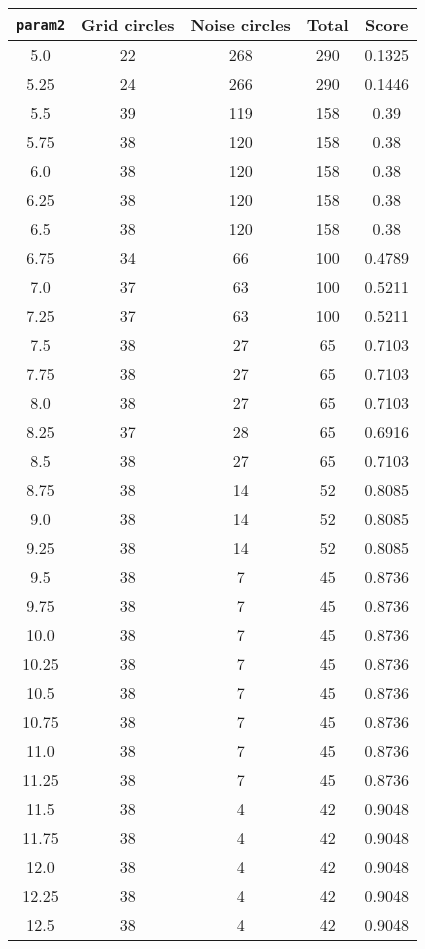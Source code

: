 \documentclass[letterpaper, 12pt]{article}
\begin{document}
\begin{longtable}{|c|c|c|c|c|}
\hline
\textbf{\texttt{param2}} & \textbf{Grid circles} & \textbf{Noise circles} & \textbf{Total} & \textbf{Score} \\
\hline
5.0 & 22 & 268 & 290 & 0.1325 \\
\hline
5.25 & 24 & 266 & 290 & 0.1446 \\
\hline
5.5 & 39 & 119 & 158 & 0.39 \\
\hline
5.75 & 38 & 120 & 158 & 0.38 \\
\hline
6.0 & 38 & 120 & 158 & 0.38 \\
\hline
6.25 & 38 & 120 & 158 & 0.38 \\
\hline
6.5 & 38 & 120 & 158 & 0.38 \\
\hline
6.75 & 34 & 66 & 100 & 0.4789 \\
\hline
7.0 & 37 & 63 & 100 & 0.5211 \\
\hline
7.25 & 37 & 63 & 100 & 0.5211 \\
\hline
7.5 & 38 & 27 & 65 & 0.7103 \\
\hline
7.75 & 38 & 27 & 65 & 0.7103 \\
\hline
8.0 & 38 & 27 & 65 & 0.7103 \\
\hline
8.25 & 37 & 28 & 65 & 0.6916 \\
\hline
8.5 & 38 & 27 & 65 & 0.7103 \\
\hline
8.75 & 38 & 14 & 52 & 0.8085 \\
\hline
9.0 & 38 & 14 & 52 & 0.8085 \\
\hline
9.25 & 38 & 14 & 52 & 0.8085 \\
\hline
9.5 & 38 & 7 & 45 & 0.8736 \\
\hline
9.75 & 38 & 7 & 45 & 0.8736 \\
\hline
10.0 & 38 & 7 & 45 & 0.8736 \\
\hline
10.25 & 38 & 7 & 45 & 0.8736 \\
\hline
10.5 & 38 & 7 & 45 & 0.8736 \\
\hline
10.75 & 38 & 7 & 45 & 0.8736 \\
\hline
11.0 & 38 & 7 & 45 & 0.8736 \\
\hline
11.25 & 38 & 7 & 45 & 0.8736 \\
\hline
11.5 & 38 & 4 & 42 & 0.9048 \\
\hline
11.75 & 38 & 4 & 42 & 0.9048 \\
\hline
12.0 & 38 & 4 & 42 & 0.9048 \\
\hline
12.25 & 38 & 4 & 42 & 0.9048 \\
\hline
12.5 & 38 & 4 & 42 & 0.9048 \\

\end{longtable}
\end{document}
